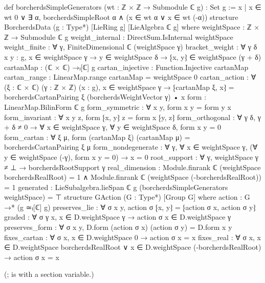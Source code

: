 \begin{leancode}
def borcherdsSimpleGenerators (wt : ℤ × ℤ → Submodule ℂ g) : Set g :=
  {x | x ∈ wt 0 ∨ ∃ α, borcherdsSimpleRoot α ∧ (x ∈ wt α ∨ x ∈ wt (-α))}
structure BorcherdsData (g : Type*) [LieRing g] [LieAlgebra ℂ g] where
  weightSpace : ℤ × ℤ → Submodule ℂ g
  weight_internal : DirectSum.IsInternal weightSpace
  weight_finite : ∀ γ, FiniteDimensional ℂ (weightSpace γ)
  bracket_weight : ∀ {γ δ} {x y : g},
    x ∈ weightSpace γ → y ∈ weightSpace δ → ⁅x, y⁆ ∈ weightSpace (γ + δ)
  cartanMap : (ℂ × ℂ) →ₗ[ℂ] g
  cartan_injective : Function.Injective cartanMap
  cartan_range : LinearMap.range cartanMap = weightSpace 0
  cartan_action : ∀ (ξ : ℂ × ℂ) (γ : ℤ × ℤ) (x : g), x ∈ weightSpace γ →
    ⁅cartanMap ξ, x⁆ = borcherdsCartanPairing ξ (borcherdsWeightVector γ) • x
  form : LinearMap.BilinForm ℂ g
  form_symmetric : ∀ x y, form x y = form y x
  form_invariant : ∀ x y z, form ⁅x, y⁆ z = form x ⁅y, z⁆
  form_orthogonal : ∀ γ δ, γ + δ ≠ 0 → ∀ x ∈ weightSpace γ,
    ∀ y ∈ weightSpace δ, form x y = 0
  form_cartan : ∀ ξ μ, form (cartanMap ξ) (cartanMap μ) = borcherdsCartanPairing ξ μ
  form_nondegenerate : ∀ γ, ∀ x ∈ weightSpace γ,
    (∀ y ∈ weightSpace (-γ), form x y = 0) → x = 0
  root_support : ∀ γ, weightSpace γ ≠ ⊥ → borcherdsRootSupport γ
  real_dimension : Module.finrank ℂ (weightSpace borcherdsRealRoot) = 1 ∧
    Module.finrank ℂ (weightSpace (-borcherdsRealRoot)) = 1
  generated : LieSubalgebra.lieSpan ℂ g (borcherdsSimpleGenerators weightSpace) = ⊤
structure GAction (G : Type*) [Group G] where
  action : G →* (g ≃ₗ[ℂ] g)
  preserves_lie : ∀ σ x y, action σ ⁅x, y⁆ = ⁅action σ x, action σ y⁆
  graded : ∀ σ γ x, x ∈ D.weightSpace γ → action σ x ∈ D.weightSpace γ
  preserves_form : ∀ σ x y, D.form (action σ x) (action σ y) = D.form x y
  fixes_cartan : ∀ σ x, x ∈ D.weightSpace 0 → action σ x = x
  fixes_real : ∀ σ x,
    x ∈ D.weightSpace borcherdsRealRoot ∨ x ∈ D.weightSpace (-borcherdsRealRoot) →
      action σ x = x
\end{leancode}
(;  is  with
 a section variable.)
